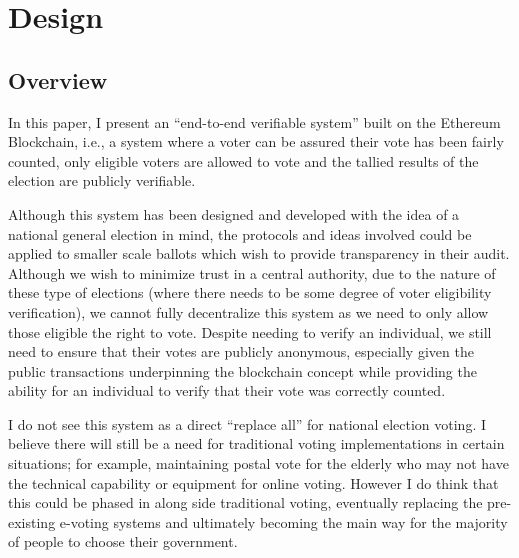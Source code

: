 \documentclass{article}
\begin{document}
    \section{Design}
    
    \subsection{Overview}
    
In this paper, I present an ``end-to-end verifiable system'' built on the Ethereum Blockchain, i.e., a system where a voter can be assured their vote has been fairly counted, only eligible voters are allowed to vote and the tallied results of the election are publicly verifiable.

Although this system has been designed and developed with the idea of a national general election in mind, the protocols and ideas involved could be applied to smaller scale ballots which wish to provide transparency in their audit. Although we wish to minimize trust in a central authority, due to the nature of these type of elections (where there needs to be some degree of voter eligibility verification), we cannot fully decentralize this system as we need to only allow those eligible the right to vote. Despite needing to verify an individual, we still need to ensure that their votes are publicly anonymous, especially given the public transactions underpinning the blockchain concept while providing the ability for an individual to verify that their vote was correctly counted.

I do not see this system as a direct ``replace all'' for national election voting. I believe there will still be a need for traditional voting implementations in certain situations; for example, maintaining postal vote for the elderly who may not have the technical capability or equipment for online voting. However I do think that this could be phased in along side traditional voting, eventually replacing the pre-existing e-voting systems and ultimately becoming the main way for the majority of people to choose their government. 
\end{document}
